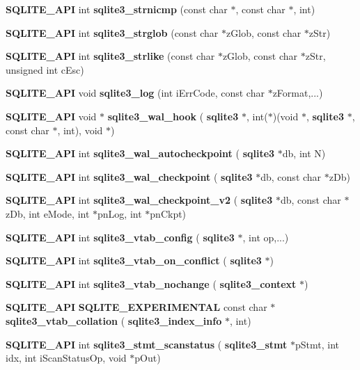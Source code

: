 \begin{DoxyCompactItemize}
\item 
\textbf{ S\+Q\+L\+I\+T\+E\+\_\+\+A\+PI} int \textbf{ sqlite3\+\_\+strnicmp} (const char $\ast$, const char $\ast$, int)
\item 
\textbf{ S\+Q\+L\+I\+T\+E\+\_\+\+A\+PI} int \textbf{ sqlite3\+\_\+strglob} (const char $\ast$z\+Glob, const char $\ast$z\+Str)
\item 
\textbf{ S\+Q\+L\+I\+T\+E\+\_\+\+A\+PI} int \textbf{ sqlite3\+\_\+strlike} (const char $\ast$z\+Glob, const char $\ast$z\+Str, unsigned int c\+Esc)
\item 
\textbf{ S\+Q\+L\+I\+T\+E\+\_\+\+A\+PI} void \textbf{ sqlite3\+\_\+log} (int i\+Err\+Code, const char $\ast$z\+Format,...)
\item 
\textbf{ S\+Q\+L\+I\+T\+E\+\_\+\+A\+PI} void $\ast$ \textbf{ sqlite3\+\_\+wal\+\_\+hook} (\textbf{ sqlite3} $\ast$, int($\ast$)(void $\ast$, \textbf{ sqlite3} $\ast$, const char $\ast$, int), void $\ast$)
\item 
\textbf{ S\+Q\+L\+I\+T\+E\+\_\+\+A\+PI} int \textbf{ sqlite3\+\_\+wal\+\_\+autocheckpoint} (\textbf{ sqlite3} $\ast$db, int N)
\item 
\textbf{ S\+Q\+L\+I\+T\+E\+\_\+\+A\+PI} int \textbf{ sqlite3\+\_\+wal\+\_\+checkpoint} (\textbf{ sqlite3} $\ast$db, const char $\ast$z\+Db)
\item 
\textbf{ S\+Q\+L\+I\+T\+E\+\_\+\+A\+PI} int \textbf{ sqlite3\+\_\+wal\+\_\+checkpoint\+\_\+v2} (\textbf{ sqlite3} $\ast$db, const char $\ast$z\+Db, int e\+Mode, int $\ast$pn\+Log, int $\ast$pn\+Ckpt)
\item 
\textbf{ S\+Q\+L\+I\+T\+E\+\_\+\+A\+PI} int \textbf{ sqlite3\+\_\+vtab\+\_\+config} (\textbf{ sqlite3} $\ast$, int op,...)
\item 
\textbf{ S\+Q\+L\+I\+T\+E\+\_\+\+A\+PI} int \textbf{ sqlite3\+\_\+vtab\+\_\+on\+\_\+conflict} (\textbf{ sqlite3} $\ast$)
\item 
\textbf{ S\+Q\+L\+I\+T\+E\+\_\+\+A\+PI} int \textbf{ sqlite3\+\_\+vtab\+\_\+nochange} (\textbf{ sqlite3\+\_\+context} $\ast$)
\item 
\textbf{ S\+Q\+L\+I\+T\+E\+\_\+\+A\+PI} \textbf{ S\+Q\+L\+I\+T\+E\+\_\+\+E\+X\+P\+E\+R\+I\+M\+E\+N\+T\+AL} const char $\ast$ \textbf{ sqlite3\+\_\+vtab\+\_\+collation} (\textbf{ sqlite3\+\_\+index\+\_\+info} $\ast$, int)
\item 
\textbf{ S\+Q\+L\+I\+T\+E\+\_\+\+A\+PI} int \textbf{ sqlite3\+\_\+stmt\+\_\+scanstatus} (\textbf{ sqlite3\+\_\+stmt} $\ast$p\+Stmt, int idx, int i\+Scan\+Status\+Op, void $\ast$p\+Out)
\item 

\end{DoxyCompactItemize}
